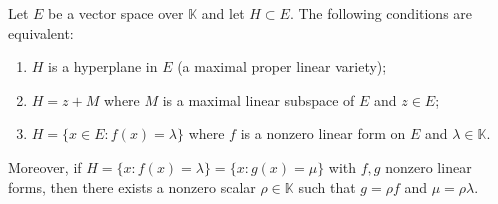 Let $E$ be a vector space over $\mathbb{K}$ and let $H \subset E$. The following conditions are equivalent:
\begin{enumerate}
\item[(a)] $H$ is a hyperplane in $E$ (a maximal proper linear variety);
\item[(b)] $H = z + M$ where $M$ is a maximal linear subspace of $E$ and $z \in E$;
\item[(c)] $H = \{x \in E : f(x) = \lambda\}$ where $f$ is a nonzero linear form on $E$ and $\lambda \in \mathbb{K}$.
\end{enumerate}
Moreover, if $H = \{x : f(x) = \lambda\} = \{x : g(x) = \mu\}$ with $f, g$ nonzero linear forms, then there exists a nonzero scalar $\rho \in \mathbb{K}$ such that $g = \rho f$ and $\mu = \rho \lambda$.
